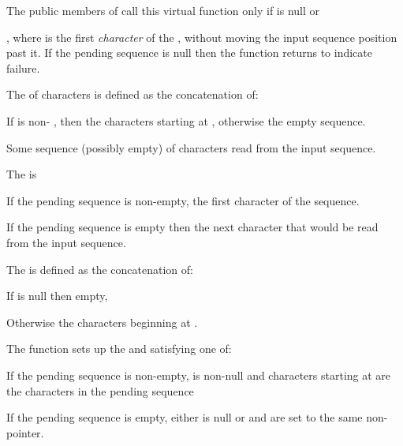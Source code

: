 \begin{itemdescr}
\pnum
\notes
The public members of
call this virtual function only if
is null or

\pnum
\returns
{},
where  is the first
\textit{character}
of the
,
without moving the input sequence position past it.
If the pending sequence is null then the function returns
to indicate failure.

\pnum
The
of characters is defined as the concatenation of:
\begin{enumeratea}
\item
If
is non-
,
then the
characters starting at
,
otherwise the empty sequence.
\item
Some sequence (possibly empty) of characters read from the input sequence.
\end{enumeratea}

\pnum
The
is
\begin{enumeratea}
\item
If the pending sequence is non-empty, the first character of the sequence.
\item
If the pending sequence
is
empty then the next character that would be read from the input sequence.
\end{enumeratea}

\pnum
The
is defined as the concatenation of:
\begin{enumeratea}
\item
If
is null then empty,
\item
Otherwise the
characters beginning at
.
\end{enumeratea}

\pnum
\effects
The function sets up the
and
satisfying one of:
\begin{enumeratea}
\item
If the pending sequence is non-empty,
is non-null and
characters starting at
are the characters in the pending sequence
\item
If the pending sequence is empty, either
is null or
and
are set to the same
non-
pointer.
\end{enumeratea}


\end{itemdescr}
